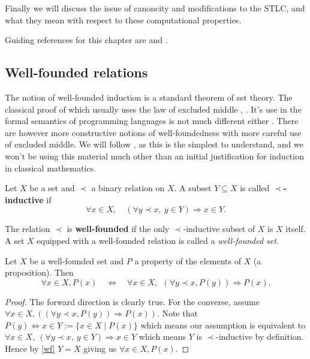 Finally we will discuss the issue of canoncity and modifications to the STLC, and what they mean with respect to these computational properties.

Guiding references for this chapter are \cite{Sorensen} and \cite{BarendregtHenk2013Lcwt}.

\subsection{Well-founded relations}

The notion of well-founded induction is a standard theorem of set theory. The classical proof of which usually uses the law of excluded middle \cite[p. 62]{johnstone1987notes}, \cite[Ch. 7]{barwise1982handbook}. It's use in the formal semantics of programming languages is not much different either \cite[Ch. 3]{winskel1993formal}. There are however more constructive notions of well-foundedness \cite[\S 8]{2018arXiv180805204S} with more careful use of excluded middle. We will follow \cite{10.2307/2275781}, as this is the simplest to understand, and we won't be using this material much other than an initial justification for induction in classical mathematics.

\begin{defin}
    Let $X$ be a set and $\prec$ a binary relation on $X$. A subset $Y \subseteq X$ is called \textbf{$\prec$-inductive} if
    $$
        \forall x \in X, \quad (\forall y \prec x,\ y \in Y) \Rightarrow x \in Y.
    $$
\end{defin}

\begin{defin}\label{wf}
    The relation $\prec$ is \textbf{well-founded} if the only $\prec$-inductive subset of $X$ is $X$ itself. A set $X$ equipped with a well-founded relation is called a \textit{well-founded set}.
\end{defin}

\begin{theorem}
    Let $X$ be a well-founded set and $P$ a property of the elements of $X$ (a proposition). Then
    $$
        \forall x \in X, P(x) \quad \iff \quad  \forall x \in X,\ \ (\forall y \prec x, P(y)) \Rightarrow P(x).
    $$
\end{theorem}

\begin{proof}
    The forward direction is clearly true. For the converse, assume $\forall x \in X,((\forall y \prec x, P(y)) \Rightarrow P(x))$. Note that $P(y) \Leftrightarrow x \in Y := \{ x \in X \mid P(x)\} $ which means our assumption is equivalent to $\forall x \in X,\ (\forall y \prec x,\ y \in Y) \Rightarrow x \in Y$ which means $Y$ is $\prec$-inductive by definition. Hence by \ref{wf} $Y=X$ giving us $ \forall x \in X, P(x)$.
\end{proof}

